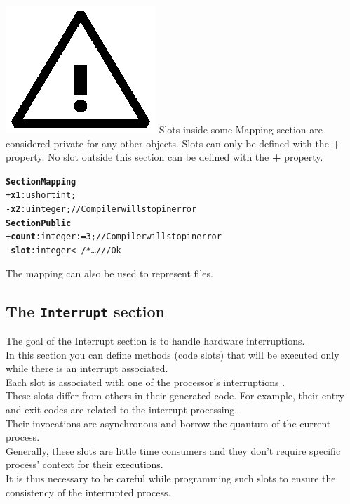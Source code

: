 \documentclass[11pt]{mybook}
\newcommand{\warning}{\includegraphics[scale=0.3]{figures/warning}}
\begin{document}
\warning{} Slots inside some Mapping section are considered private for any other objects.
Slots can only be defined with the {\bf{}+} property. No slot outside this section can be defined with the {\bf{}+} property.\\
\begin{alltt}
{\bf{}Section Mapping}
  + {\bf{}x1}:{\sc{}ushortint};   
  - {\bf{}x2}:{\sc{}uinteger};          // Compiler will stop in error
{\bf{}Section Public}
  + {\bf{}count}:{\sc{}integer} := 3;   // Compiler will stop in error
  - {\bf{}slot}:{\sc{}integer} <- /* \ldots */ // Ok
\end{alltt}

The mapping can also be used to represent files.
\subsection{The {\tt{}Interrupt} section }
\label{language_reference:section_identifiers:interrupt_section}
The goal of the Interrupt section is to handle hardware interruptions.\\
In this section you can define methods (code slots) that will be
executed only while there is an interrupt associated.\\  
Each slot is associated with one of the processor's interruptions \cite{bookpc00}.\\
These slots differ from others in their generated code. For example,
their entry and exit codes are related to the interrupt processing.\\ 
Their invocations are asynchronous and borrow the quantum of the
current process.\\ 
Generally, these slots are little time consumers and they don't
require specific process' context for their executions.\\ 
It is thus necessary to be careful while programming such slots to
ensure the consistency of the interrupted process.\\ 
\end{document}

